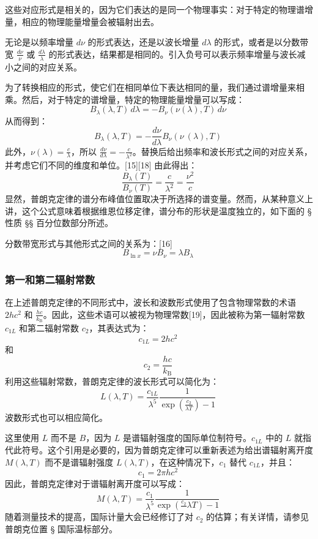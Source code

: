 这些对应形式是相关的，因为它们表达的是同一个物理事实：对于特定的物理谱增量，相应的物理能量增量会被辐射出去。

无论是以频率增量 \( d\nu \) 的形式表达，还是以波长增量 \( d\lambda \) 的形式，或者是以分数带宽 \( \frac{d\nu}{\nu} \) 或 \( \frac{d\lambda}{\lambda} \) 的形式表达，结果都是相同的。引入负号可以表示频率增量与波长减小之间的对应关系。

为了转换相应的形式，使它们在相同单位下表达相同的量，我们通过谱增量来相乘。然后，对于特定的谱增量，特定的物理能量增量可以写成：
\[
B_{\lambda}(\lambda, T)\,d\lambda = -B_{\nu}(\nu(\lambda), T)\,d\nu~
\]
从而得到：
\[
B_{\lambda}(\lambda, T) = -\frac{d\nu}{d\lambda} B_{\nu}(\nu~(\lambda), T)~
\]
此外，\( \nu(\lambda) = \frac{c}{\lambda} \)，所以 \( \frac{d\nu}{d\lambda} = -\frac{c}{\lambda^2} \)。替换后给出频率和波长形式之间的对应关系，并考虑它们不同的维度和单位。[15][18] 由此得出：
\[
\frac{B_{\lambda}(T)}{B_{\nu}(T)} = \frac{c}{\lambda^2} = \frac{\nu^2}{c}~
\]
显然，普朗克定律的谱分布峰值位置取决于所选择的谱变量。然而，从某种意义上讲，这个公式意味着根据维恩位移定律，谱分布的形状是温度独立的，如下面的 § 性质 §§ 百分位数部分所述。

分数带宽形式与其他形式之间的关系为：[16]
\[
B_{\ln x} = \nu B_{\nu} = \lambda B_{\lambda}~
\]
\subsubsection{第一和第二辐射常数}
在上述普朗克定律的不同形式中，波长和波数形式使用了包含物理常数的术语 \( 2hc^2 \) 和 \( \frac{hc}{k_{\mathrm{B}}} \)。因此，这些术语可以被视为物理常数[19]，因此被称为第一辐射常数 \( c_{1L} \) 和第二辐射常数 \( c_2 \)，其表达式为：
\[
c_{1L} = 2hc^2~
\]
和
\[
c_2 = \frac{hc}{k_{\mathrm{B}}}~
\]
利用这些辐射常数，普朗克定律的波长形式可以简化为：
\[
L(\lambda, T) = \frac{c_{1L}}{\lambda^5} \frac{1}{\exp\left(\frac{c_2}{\lambda T}\right) - 1}~
\]
波数形式也可以相应简化。

这里使用 \( L \) 而不是 \( B \)，因为 \( L \) 是谱辐射强度的国际单位制符号。\( c_{1L} \) 中的 \( L \) 就指代此符号。这个引用是必要的，因为普朗克定律可以重新表述为给出谱辐射离开度 \( M(\lambda, T) \) 而不是谱辐射强度 \( L(\lambda, T) \)，在这种情况下，\( c_1 \) 替代 \( c_{1L} \)，并且：
\[
c_1 = 2\pi hc^2~
\]
因此，普朗克定律对于谱辐射离开度可以写成：
\[
M(\lambda, T) = \frac{c_1}{\lambda^5} \frac{1}{\exp\left(\frac{c_2}~{\lambda T}\right) - 1}~
\]
随着测量技术的提高，国际计量大会已经修订了对 \( c_2 \) 的估算；有关详情，请参见普朗克位置 § 国际温标部分。
